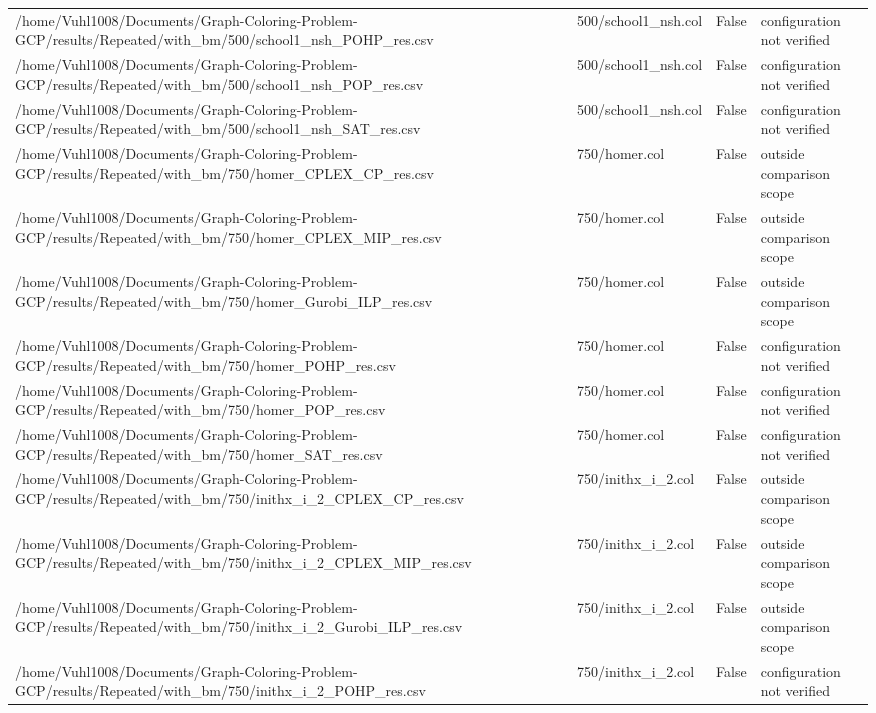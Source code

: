 \begin{table}[htbp]
\begin{tabular}{llll}
/home/Vuhl1008/Documents/Graph-Coloring-Problem-GCP/results/Repeated/with\_bm/500/school1\_nsh\_POHP\_res.csv & 500/school1\_nsh.col & False & configuration not verified \\
/home/Vuhl1008/Documents/Graph-Coloring-Problem-GCP/results/Repeated/with\_bm/500/school1\_nsh\_POP\_res.csv & 500/school1\_nsh.col & False & configuration not verified \\
/home/Vuhl1008/Documents/Graph-Coloring-Problem-GCP/results/Repeated/with\_bm/500/school1\_nsh\_SAT\_res.csv & 500/school1\_nsh.col & False & configuration not verified \\
/home/Vuhl1008/Documents/Graph-Coloring-Problem-GCP/results/Repeated/with\_bm/750/homer\_CPLEX\_CP\_res.csv & 750/homer.col & False & outside comparison scope \\
/home/Vuhl1008/Documents/Graph-Coloring-Problem-GCP/results/Repeated/with\_bm/750/homer\_CPLEX\_MIP\_res.csv & 750/homer.col & False & outside comparison scope \\
/home/Vuhl1008/Documents/Graph-Coloring-Problem-GCP/results/Repeated/with\_bm/750/homer\_Gurobi\_ILP\_res.csv & 750/homer.col & False & outside comparison scope \\
/home/Vuhl1008/Documents/Graph-Coloring-Problem-GCP/results/Repeated/with\_bm/750/homer\_POHP\_res.csv & 750/homer.col & False & configuration not verified \\
/home/Vuhl1008/Documents/Graph-Coloring-Problem-GCP/results/Repeated/with\_bm/750/homer\_POP\_res.csv & 750/homer.col & False & configuration not verified \\
/home/Vuhl1008/Documents/Graph-Coloring-Problem-GCP/results/Repeated/with\_bm/750/homer\_SAT\_res.csv & 750/homer.col & False & configuration not verified \\
/home/Vuhl1008/Documents/Graph-Coloring-Problem-GCP/results/Repeated/with\_bm/750/inithx\_i\_2\_CPLEX\_CP\_res.csv & 750/inithx\_i\_2.col & False & outside comparison scope \\
/home/Vuhl1008/Documents/Graph-Coloring-Problem-GCP/results/Repeated/with\_bm/750/inithx\_i\_2\_CPLEX\_MIP\_res.csv & 750/inithx\_i\_2.col & False & outside comparison scope \\
/home/Vuhl1008/Documents/Graph-Coloring-Problem-GCP/results/Repeated/with\_bm/750/inithx\_i\_2\_Gurobi\_ILP\_res.csv & 750/inithx\_i\_2.col & False & outside comparison scope \\
/home/Vuhl1008/Documents/Graph-Coloring-Problem-GCP/results/Repeated/with\_bm/750/inithx\_i\_2\_POHP\_res.csv & 750/inithx\_i\_2.col & False & configuration not verified \\

\end{tabular}
\end{table}
